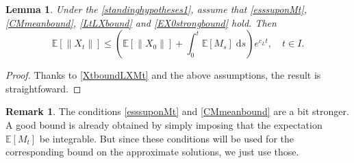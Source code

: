 \documentclass[reqno,12pt]{amsart}
\theoremstyle{plain} %
\newtheorem{lemma}{Lemma}[section]
\theoremstyle{definition} %
\newtheorem{remark}{Remark}[section]
\begin{document}
\begin{lemma}
    \label{lemstrongbound}
    Under the \cref{standinghypotheses1}, assume that \eqref{esssuponMt}, \eqref{CMmeanbound}, \eqref{LtLXbound} and \eqref{EX0strongbound} hold. Then
    \begin{equation}
        \label{EXtstrongbound}
        \mathbb{E}[\|X_t\|] \leq \left(\mathbb{E}[\|X_0\|] + \int_0^t \mathbb{E}[M_s]\;\mathrm{d}s\right) e^{c_L t}, \quad t\in I.
    \end{equation}
\end{lemma}

\begin{proof}
    Thanks to \eqref{XtboundLXMt} and the above assumptions, the result is straightfoward.
\end{proof}

\begin{remark}
    The conditions \eqref{esssuponMt} and \eqref{CMmeanbound} are a bit stronger. A good bound is already obtained by simply imposing that the expectation $\mathbb{E}\left[M_t\right]$ be integrable. But since these conditions will be used for the corresponding bound on the approximate solutions, we just use those.
\end{remark}
\end{document}
